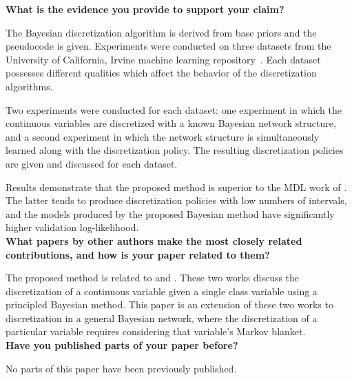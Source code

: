 \documentclass{article}
\begin{document}
\noindent
\textbf{What is the evidence you provide to support your claim?}

The Bayesian discretization algorithm is derived from base priors and the pseudocode is given.
Experiments were conducted on three datasets from the University of California, Irvine machine learning repository~\citep{Lichman_2013}.
Each dataset possesses different qualities which affect the behavior of the discretization algorithms.

Two experiments were conducted for each dataset: one experiment in which the continuous variables are discretized with a known Bayesian network structure, and a second experiment in which the network structure is simultaneously learned along with the discretization policy.
The resulting discretization policies are given and discussed for each dataset.

Results demonstrate that the proposed method is superior to the MDL work of \cite{Friedman_1996}.
The latter tends to produce discretization policies with low numbers of intervals, and the models produced by the proposed Bayesian method have significantly higher validation log-likelihood.\\[0em]

\noindent
\textbf{What papers by other authors make the most closely related contributions, and how is your paper related to them?}

The proposed method is related to \cite{Boulle_2006} and \cite{Lustgarten_2011}.
These two works discuss the discretization of a continuous variable given a single class variable using a principled Bayesian method.
This paper is an extension of these two works to discretization in a general Bayesian network, where the discretization of a particular variable requires considering that variable's Markov blanket.\\[0em]

\noindent
\textbf{Have you published parts of your paper before?}

No parts of this paper have been previously published.



\end{document}
